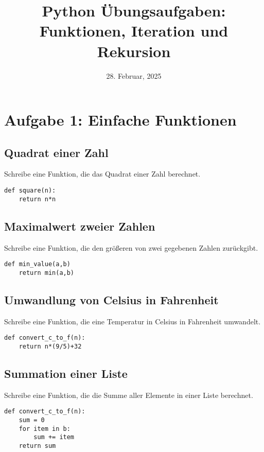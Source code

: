 \documentclass{article}
\begin{document}
\title{Python Übungsaufgaben: Funktionen, Iteration und Rekursion}
\date{28. Februar, 2025}
\maketitle

\section*{Aufgabe 1: Einfache Funktionen}

\subsection*{Quadrat einer Zahl}
Schreibe eine Funktion, die das Quadrat einer Zahl berechnet.

\begin{lstlisting}[style=pythonstyle]
def square(n):
    return n*n
\end{lstlisting}

\subsection*{Maximalwert zweier Zahlen}
Schreibe eine Funktion, die den größeren von zwei gegebenen Zahlen zurückgibt.

\begin{lstlisting}[style=pythonstyle]
def min_value(a,b)
    return min(a,b)
\end{lstlisting}

\subsection*{Umwandlung von Celsius in Fahrenheit}
Schreibe eine Funktion, die eine Temperatur in Celsius in Fahrenheit umwandelt.

\begin{lstlisting}[style=pythonstyle]
def convert_c_to_f(n):
    return n*(9/5)+32
\end{lstlisting}

\subsection*{Summation einer Liste}
Schreibe eine Funktion, die die Summe aller Elemente in einer Liste berechnet.

\begin{lstlisting}[style=pythonstyle]
def convert_c_to_f(n):
    sum = 0
    for item in b:
        sum += item
    return sum
\end{lstlisting}
\end{document}
